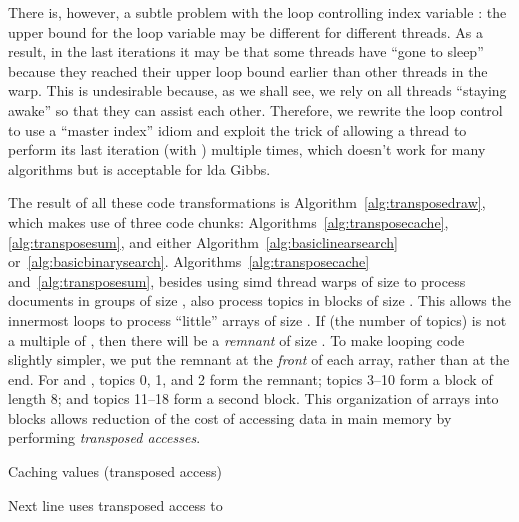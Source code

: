 \documentclass[10pt,nohyperref]{sigplanconf}
\newcommand*\Assign[2]{\State #1  #2}
\newcommand*\Bind[2]{\State {\bf let} #1  #2}
\newcommand*\Remark[1]{\State  #1}
\begin{document}
There is, however, a subtle problem with the loop controlling index variable : the upper bound  for the loop
variable may be different for different threads.  As a result, in the last iterations it may be that some threads
have ``gone to sleep'' because they reached their upper loop bound earlier than other threads in the warp.
This is undesirable because, as we shall see, we rely on all threads ``staying awake'' so that they can assist
each other.  Therefore, we rewrite the loop control to use a ``master index'' idiom and exploit the trick of allowing a thread
to perform its last iteration (with ) multiple times, which doesn't work for many algorithms
but is acceptable for {\sc lda} Gibbs.


The result of all these code transformations is Algorithm~\ref{alg:transposedraw},
which makes use of three code chunks: Algorithms~\ref{alg:transposecache}, \ref{alg:transposesum}, and either
Algorithm~\ref{alg:basiclinearsearch} or~\ref{alg:basicbinarysearch}.
Algorithms~\ref{alg:transposecache} and~\ref{alg:transposesum}, besides using {\sc simd} thread warps of size 
to process documents in groups of size , also process topics in blocks of size .  This allows the innermost loops to process ``little'' arrays
of size .  If  (the number of topics) is not a multiple of , then there will be a \emph{remnant} of size .
To make looping code slightly simpler, we put the remnant at the \emph{front} of each array, rather than at the end.
For  and , topics 0, 1, and 2 form the remnant; topics 3--10 form a block of length 8;
and topics 11--18 form a second block.  This organization of arrays into blocks
allows reduction of the cost of accessing data in main memory by performing \emph{transposed accesses}.



\begin{algorithm}[t]
\caption{Caching  values (transposed access)}\label{alg:transposecache}
\begin{algorithmic}[1]
          \Bind{}{}
            \While{}   \label{z6cacheremnantloopstart}
               \Assign{}{}
               \Assign{}{}
            \EndWhile    \label{z6cacheremnantloopend}
            \While{}
                  \label{z6cacheblockloopstart}
                  \Remark{Next line uses transposed access to }
                  \Assign{}{}     \label{z6thetaaccess}
               \EndFor    \label{z6cacheblockloopend}
              \Assign{}{}
            \EndWhile
\End
\end{algorithmic}
\end{algorithm}
\end{document}

